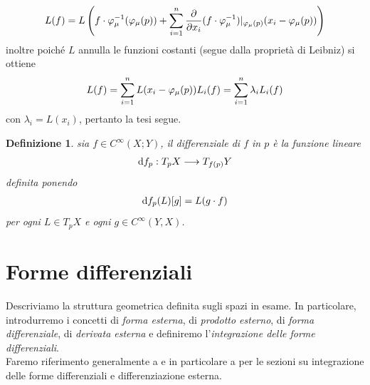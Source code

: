 \documentclass[oneside, 11pt]{amsbook}
\makeatletter
\newcommand{\0}{{(0)}}
\newcommand{\3}{{(3)}}
\theoremstyle{colonplain}
\theoremstyle{colondefinition}
\newtheorem{defn}[thm]{Definizione}
\theoremstyle{colonremark}
\numberwithin{equation}{chapter}
\renewcommand{\proofname}{Dimostrazione}
\renewenvironment{proof}[1][\proofname]{\par
  \pushQED{\qed}%
  \normalfont \topsep6\p@\@plus6\p@\relax
  \trivlist
  \item[\hskip\labelsep\bfseries #1:]\ignorespaces
}{%
  \popQED\endtrivlist\@endpefalse
}
\makeatother
\begin{document}
\begin{proof}
\begin{align}
    L(f) = L \left( f \cdot \varphi^{-1}_\mu(\varphi_\mu(p)) + \sum_{i = 1}^n \frac{\partial}{\partial x_i}(f \cdot \varphi^{-1}_\mu)|_{\varphi_\mu(p)} (x_i - \varphi_\mu(p)) \right) \notag
\end{align}
inoltre poiché $L$ annulla le funzioni costanti (segue dalla proprietà di Leibniz) si ottiene
\begin{align}
    L(f) = \sum_{i = 1}^n L(x_i - \varphi_\mu(p))L_i(f) = \sum_{i = 1}^n \lambda_i L_i(f) \notag
\end{align}
con $\lambda_i = L(x_i)$, pertanto la tesi segue. \end{proof}
\begin{defn} sia $f \in C^{\infty}(X; Y)$, il \textit{differenziale} di $f$ in $p$ è la funzione lineare
\begin{align}
    \mathrm{d}f_p : T_pX \longrightarrow T_{f(p)}Y \notag
\end{align}
definita ponendo
\begin{align}
    \mathrm{d}f_p(L)[g] = L(g \cdot f) \notag
\end{align}
per ogni $L \in T_pX$ e ogni $g \in C^{\infty}(Y, X)$.
\end{defn}

\chapter{Forme differenziali}
Descriviamo la struttura geometrica definita sugli spazi in esame. In particolare, introdurremo i concetti di \textit{forma esterna}, di \textit{prodotto esterno}, di \textit{forma differenziale}, di \textit{derivata esterna} e definiremo l'\textit{integrazione delle forme differenziali}. \\
Faremo riferimento generalmente a \cite{Arnold} e in particolare a \cite{Lee} per le sezioni su integrazione delle forme differenziali e differenziazione esterna.
\end{document}
